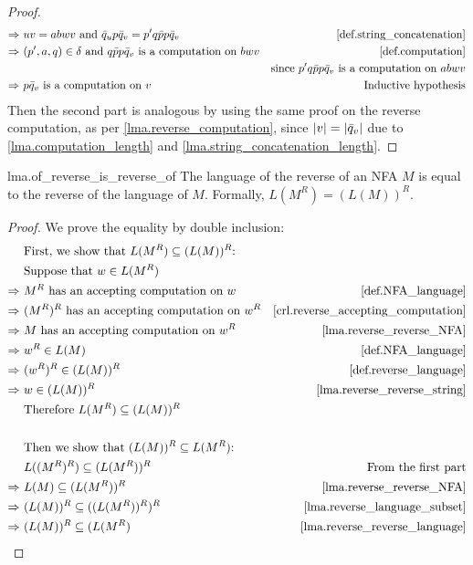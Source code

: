 \documentclass{report}
\DeclarePairedDelimiter{\abs}{\lvert}{\rvert}
\theoremstyle{definition}
\begin{document}
\begin{appendices}
\begin{proof}
\begin{align*}
\Rightarrow \ & uv = abwv \text{ and }
\bar{q}_u p \bar{q}_v = p'q \bar{p} p \bar{q}_v
& \text{\cref{def.string_concatenation}} \\
\Rightarrow \ & (p', a, q) \in \delta \text{ and }
q \bar{p} p \bar{q}_v \text{ is a computation on } bwv
& \text{\cref{def.computation}} \\
& & \text{since } p'q \bar{p} p \bar{q}_v \text{ is a computation on } abwv \\
\Rightarrow \ & p \bar{q}_v \text{ is a computation on } v
& \text{Inductive hypothesis}
\end{align*}
Then the second part is analogous by using the same proof on the reverse
computation, as per \cref{lma.reverse_computation}, since
$\abs{v} = \abs{\bar{q}_v}$ due to \cref{lma.computation_length} and
\cref{lma.string_concatenation_length}.
\end{proof}

\begin{replemma}{lma.of_reverse_is_reverse_of}
The language of the reverse of an NFA $M$ is equal to the reverse of the language
of $M$. Formally, $L(M^R) = (L(M))^R$.
\end{replemma}

\begin{proof}
We prove the equality by double inclusion:
\begin{align*}
& \text{First, we show that } L(M^R) \subseteq (L(M))^R \text{:} \\
& \text{Suppose that } w \in L(M^R) \\
\Rightarrow \ & M^R \text{ has an accepting computation on } w
& \text{\cref{def.NFA_language}} \\
\Rightarrow \ & (M^R)^R \text{ has an accepting computation on } w^R
& \text{\cref{crl.reverse_accepting_computation}} \\
\Rightarrow \ & M \text{ has an accepting computation on } w^R
& \text{\cref{lma.reverse_reverse_NFA}} \\
\Rightarrow \ & w^R \in L(M)
& \text{\cref{def.NFA_language}} \\
\Rightarrow \ & (w^R)^R \in (L(M))^R
& \text{\cref{def.reverse_language}} \\
\Rightarrow \ & w \in (L(M))^R
& \text{\cref{lma.reverse_reverse_string}} \\
& \text{Therefore } L(M^R) \subseteq (L(M))^R \\
\\
& \text{Then we show that } (L(M))^R \subseteq L(M^R) \text{:} \\
& L((M^R)^R) \subseteq (L(M^R))^R
& \text{From the first part} \\
\Rightarrow \ & L(M) \subseteq (L(M^R))^R
& \text{\cref{lma.reverse_reverse_NFA}} \\
\Rightarrow \ & (L(M))^R \subseteq ((L(M^R))^R)^R
& \text{\cref{lma.reverse_language_subset}} \\
\Rightarrow \ & (L(M))^R \subseteq (L(M^R)
& \text{\cref{lma.reverse_reverse_language}}
\end{align*}
\end{proof}


\end{appendices}
\end{document}
